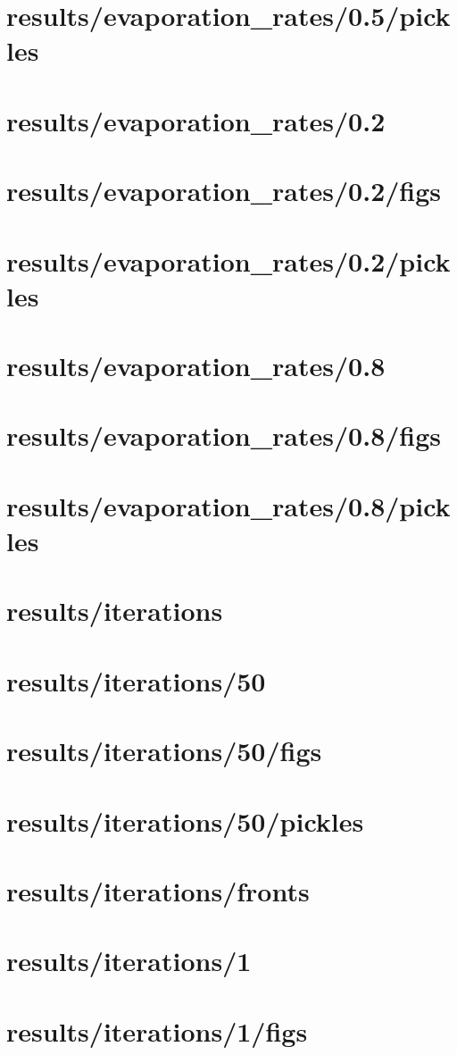 \section{results/evaporation_rates/0.5/pickles}
\section{results/evaporation_rates/0.2}
\section{results/evaporation_rates/0.2/figs}
\section{results/evaporation_rates/0.2/pickles}
\section{results/evaporation_rates/0.8}
\section{results/evaporation_rates/0.8/figs}
\section{results/evaporation_rates/0.8/pickles}
\section{results/iterations}
\section{results/iterations/50}
\section{results/iterations/50/figs}
\section{results/iterations/50/pickles}
\section{results/iterations/fronts}
\section{results/iterations/1}
\section{results/iterations/1/figs}
